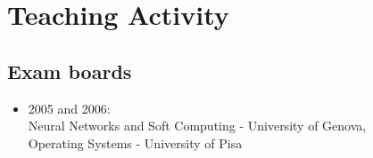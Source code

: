 \documentclass[a4paper,10pt]{article}
\begin{document}
\section*{Teaching Activity}

\subsection*{Exam boards}
\begin{itemize}
\item 2005 and 2006: \\
  Neural Networks and Soft Computing - University of Genova, \\ Operating Systems - University of Pisa
\end{itemize}

\end{document}
